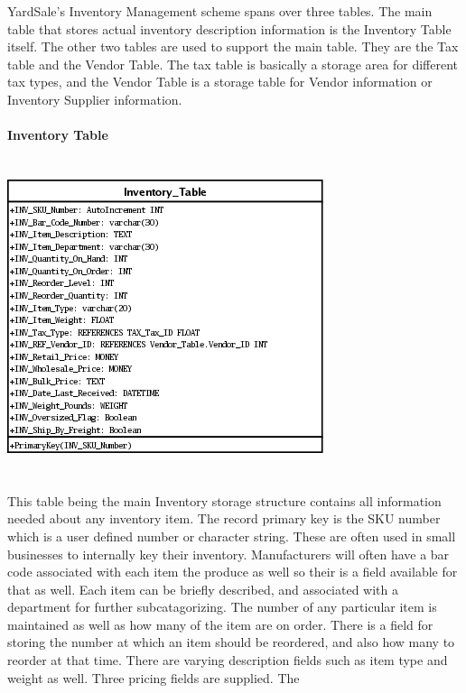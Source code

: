 \documentclass{report}
\begin{document}
\begin{itemize}
        YardSale's Inventory Management scheme spans over three tables. The main table that
        stores actual inventory description information is the Inventory Table itself. The
        other two tables are used to support the main table. They are the Tax table and the
        Vendor Table. The tax table is basically a storage area for different tax types, and
        the Vendor Table is a storage table for Vendor information or Inventory Supplier
        information.\\
        \\
        {\bf Inventory Table}\\
        \\
        \\
        \includegraphics{Tables/InventoryTable.png}\\
        \\
        \\
        This table being the main Inventory storage structure contains all information needed
        about any inventory item. The record primary key is the SKU number which is a user
        defined number or character string. These are often used in small businesses to
        internally key their inventory. Manufacturers will often have a bar code associated
        with each item the produce as well so their is a field available for that as well.
        Each item can be briefly described, and associated with a department for further
        subcatagorizing. The number of any particular item is maintained as well as how many
        of the item are on order. There is a field for storing the number at which an item should
        be reordered, and also how many to reorder at that time. There are varying description
        fields such as item type and weight as well. Three pricing fields are supplied. The

\end{itemize}
\end{document}
